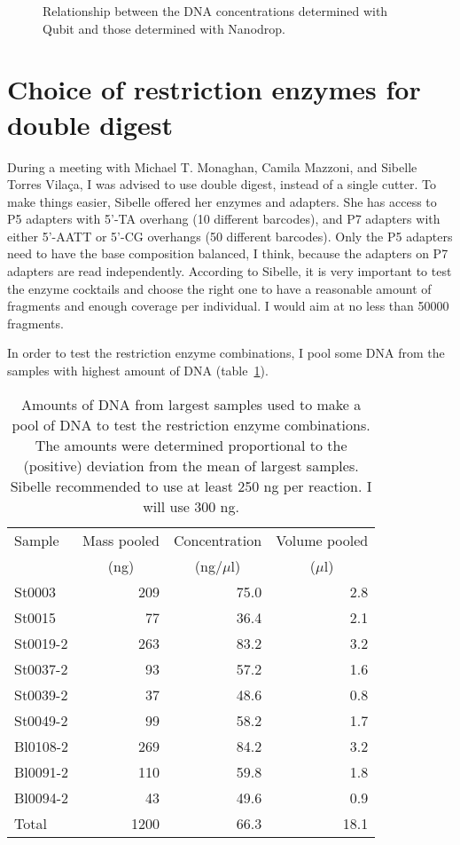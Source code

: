 \documentclass[a4paper,12pt,twosided]{article}
\begin{document}
\begin{figure}
\caption{Relationship between the DNA concentrations determined with Qubit and those determined with Nanodrop.}\label{fig:quantification}
\end{figure}

\section{Choice of restriction enzymes for double digest}
During a meeting with Michael T. Monaghan, Camila Mazzoni, and Sibelle Torres Vilaça, I was advised to use double digest, instead of a single cutter. To make things easier, Sibelle offered her enzymes and adapters. She has access to P5 adapters with 5'-TA overhang (10 different barcodes), and P7 adapters with either 5'-AATT or 5'-CG overhangs (50 different barcodes). Only the P5 adapters need to have the base composition balanced, I think, because the adapters on P7 adapters are read independently. According to Sibelle, it is very important to test the enzyme cocktails and choose the right one to have a reasonable amount of fragments and enough coverage per individual. I would aim at no less than 50000 fragments.

In order to test the restriction enzyme combinations, I pool some DNA from the samples with highest amount of DNA (table~\ref{tau:pool1}).

\begin{table}
\begin{center}
\caption{Amounts of DNA from largest samples used to make a pool of DNA to test the restriction enzyme combinations. The amounts were determined proportional to the (positive) deviation from the mean of largest samples. Sibelle recommended to use at least 250 ng per reaction. I will use 300 ng.}\label{tau:pool1}
\vspace*{0.2cm}
\begin{tabular}{lrrr}
\toprule
Sample&Mass pooled&Concentration&Volume pooled\\
&\multicolumn{1}{c}{(ng)}&\multicolumn{1}{c}{(ng/$\mu$l)}&\multicolumn{1}{c}{($\mu$l)}\\
\midrule
St0003&209&75.0&2.8\\
St0015&77&36.4&2.1\\
St0019-2&263&83.2&3.2\\
St0037-2&93&57.2&1.6\\
St0039-2&37&48.6&0.8\\
St0049-2&99&58.2&1.7\\
Bl0108-2&269&84.2&3.2\\
Bl0091-2&110&59.8&1.8\\
Bl0094-2&43&49.6&0.9\\
\midrule
Total&1200&66.3&18.1\\
\bottomrule
\end{tabular}
\end{center}
\end{table}
\end{document}
